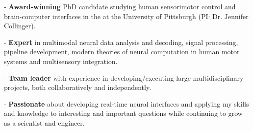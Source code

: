 \vspace*{-0.5cm}

\begin{cvparagraph}
- \textbf{Award-winning} PhD candidate studying human sensorimotor control and brain-computer interfaces in the  at the University of Pittsburgh (PI: Dr. Jennifer Collinger). 

- \textbf{Expert} in multimodal neural data analysis and decoding, signal processing, pipeline development, modern theories of neural computation in human motor systems and multisensory integration.

- \textbf{Team leader} with experience in developing/executing large multidisciplinary projects, both collaboratively and independently.

- \textbf{Passionate} about developing real-time neural interfaces and applying my skills and knowledge to interesting and important questions while continuing to grow as a scientist and engineer.
\vspace*{-0.6cm}
\end{cvparagraph}
